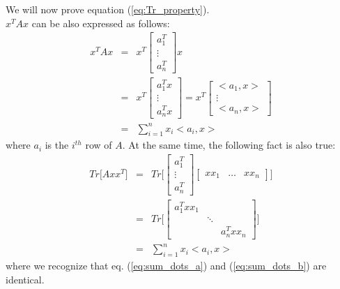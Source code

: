 \documentclass{article}
\begin{document}
We will now prove equation (\ref{eq:Tr_property}).
\\
$x^T A x$ can be also expressed as follows:
\begin{eqnarray}
x^T A x &=& x^T \begin{bmatrix} 
a_1^T \\
\vdots \\ 
a_n^T
\end{bmatrix} x \\
&=&
x^T \begin{bmatrix} 
a_1^T x \\
\vdots \\ 
a_n^T x
\end{bmatrix} = x^T \begin{bmatrix} 
<a_1, x> \\
\vdots \\ 
<a_n, x>
\end{bmatrix} \\
&=&
\sum_{i = 1}^n x_i <a_i, x>
\label{eq:sum_dots_a}
\end{eqnarray}
where $a_i$ is the $i^{th}$ row of $A$.
At the same time, the following fact is also true:
\begin{eqnarray}
Tr \bigg [ A x x^T \bigg ] &=& 
Tr \bigg [
\begin{bmatrix} a_1^T \\ \vdots \\ a_n^T \end{bmatrix}
\begin{bmatrix} xx_1 & \hdots & xx_n \end{bmatrix}
\bigg ]  \\
&=&
Tr \bigg [
\begin{bmatrix} 
a_1^T xx_1 & & \\
& \ddots & \\
& & a_n^T xx_n
\end{bmatrix}
\bigg ] \\
&=&
\sum_{i = 1}^n x_i <a_i, x>
\label{eq:sum_dots_b}
\end{eqnarray}
where we recognize that eq. (\ref{eq:sum_dots_a}) and (\ref{eq:sum_dots_b}) are identical.



\end{document}
